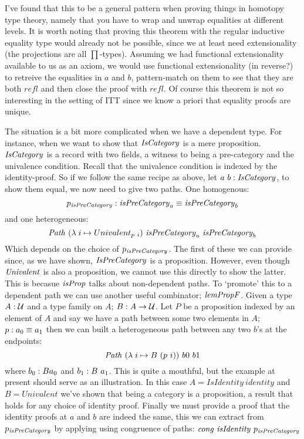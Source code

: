 %
I've found that this to be a general pattern when proving things in homotopy
type theory, namely that you have to wrap and unwrap equalities at different
levels. It is worth noting that proving this theorem with the regular inductive
equality type would already not be possible, since we at least need
extensionality (the projections are all $\prod$-types). Assuming we had
functional extensionality available to us as an axiom, we would use functional
extensionality (in reverse?) to retreive the equalities in $a$ and $b$,
pattern-match on them to see that they are both $\mathit{refl}$ and then close
the proof with $\mathit{refl}$. Of course this theorem is not so interesting in
the setting of ITT since we know a priori that equality proofs are unique.

The situation is a bit more complicated when we have a dependent type. For
instance, when we want to show that $\mathit{IsCategory}$ is a mere proposition.
$\mathit{IsCategory}$ is a record with two fields, a witness to being a pre-category and
the univalence condition. Recall that the univalence condition is indexed by the
identity-proof. So if we follow the same recipe as above, let $a\ b \mathrel{:}
\mathit{IsCategory}$, to show them equal, we now need to give two paths. One homogenous:
%
$$
p_{\mathit{isPreCategory}} \mathrel{:} \mathit{isPreCategory}_a \equiv \mathit{isPreCategory}_b
$$
%
and one heterogeneous:
%
$$
\Path\ (\lambda\; i \mto Univalent_{p\ i})\ \isPreCategory_a\ \isPreCategory_b
$$
%
Which depends on the choice of $p_{\mathit{isPreCategory}}$. The first of these we can
provide since, as we have shown, $\mathit{IsPreCategory}$ is a proposition. However,
even though $\mathit{Univalent}$ is also a proposition, we cannot use this directly to
show the latter. This is becasue $\mathit{isProp}$ talks about non-dependent paths. To
`promote' this to a dependent path we can use another useful combinator;
$\mathit{lemPropF}$. Given a type $A \mathrel{:} \mathcal{U}$ and a type family on $A$; $B \mathrel{:} A \to
\mathcal{U}$. Let $P$ be a proposition indexed by an element of $A$ and say we have a
path between some two elements in $A$; $p \mathrel{:} a_0 \equiv a_1$ then we can built a
heterogeneous path between any two $b$'s at the endpoints:
%
$$
\mathit{Path}\ (\lambda\; i \mapsto B\ (p\ i))\ b0\ b1
$$
%
where $b_0 \mathrel{:} B a_0$ and $b_1 \mathrel{:} B\ a_1$. This is quite a mouthful, but the
example at present should serve as an illustration. In this case $A =
\mathit{IsIdentity}\ \mathit{identity}$ and $B = \mathit{Univalent}$ we've shown
that being a category is a proposition, a result that holds for any choice of
identity proof. Finally we must provide a proof that the identity proofs at $a$
and $b$ are indeed the same, this we can extract from $p_{\mathit{isPreCategory}}$ by
applying using congruence of paths: $\congruence\ \mathit{isIdentity}\
p_{\isPreCategory}$

